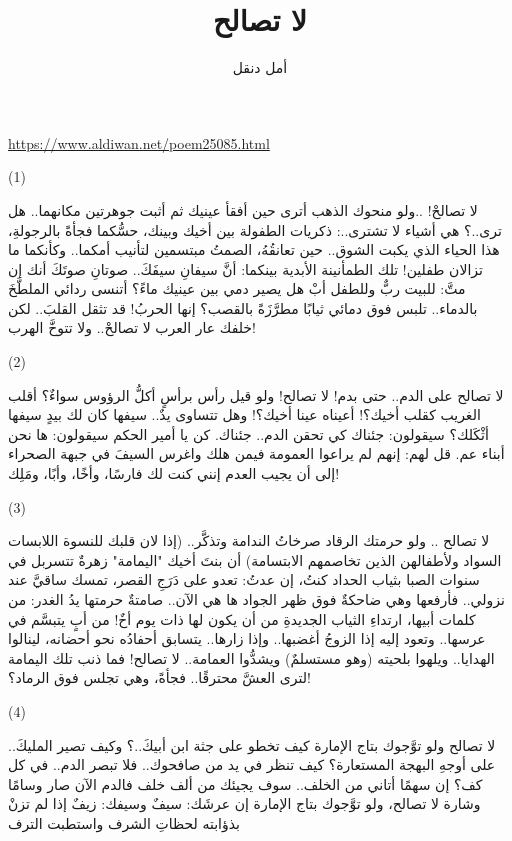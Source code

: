 \documentclass{article}
\title{لا تصالح}
\author{\textarabic{أمل دنقل}}
\date{}
\begin{document}
\centering

\maketitle

\textenglish{\href{https://www.aldiwan.net/poem25085.html}{https://www.aldiwan.net/poem25085.html}}

\begin{modernpoem*}
(\textenglish{1})

لا تصالحْ!
..ولو منحوك الذهب
أترى حين أفقأ عينيك
ثم أثبت جوهرتين مكانهما..
هل ترى..؟
هي أشياء لا تشترى..:
ذكريات الطفولة بين أخيك وبينك،
حسُّكما فجأةً بالرجولةِ،
هذا الحياء الذي يكبت الشوق.. حين تعانقُهُ،
الصمتُ مبتسمين لتأنيب أمكما.. وكأنكما
ما تزالان طفلين!
تلك الطمأنينة الأبدية بينكما:
أنَّ سيفانِ سيفَكَ..
صوتانِ صوتَكَ
أنك إن متَّ:
للبيت ربٌّ
وللطفل أبْ
هل يصير دمي بين عينيك ماءً؟
أتنسى ردائي الملطَّخَ بالدماء..
تلبس فوق دمائي ثيابًا مطرَّزَةً بالقصب؟
إنها الحربُ!
قد تثقل القلبَ..
لكن خلفك عار العرب
لا تصالحْ..
ولا تتوخَّ الهرب!

(\textenglish{2})

لا تصالح على الدم.. حتى بدم!
لا تصالح! ولو قيل رأس برأسٍ
أكلُّ الرؤوس سواءٌ؟
أقلب الغريب كقلب أخيك؟!
أعيناه عينا أخيك؟!
وهل تتساوى يدٌ.. سيفها كان لك
بيدٍ سيفها أثْكَلك؟
سيقولون:
جئناك كي تحقن الدم..
جئناك. كن يا أمير الحكم
سيقولون:
ها نحن أبناء عم.
قل لهم: إنهم لم يراعوا العمومة فيمن هلك
واغرس السيفَ في جبهة الصحراء
إلى أن يجيب العدم
إنني كنت لك
فارسًا،
وأخًا،
وأبًا،
ومَلِك!

(\textenglish{3})

لا تصالح ..
ولو حرمتك الرقاد
صرخاتُ الندامة
وتذكَّر..
(إذا لان قلبك للنسوة اللابسات السواد ولأطفالهن الذين تخاصمهم الابتسامة)
أن بنتَ أخيك "اليمامة"
زهرةٌ تتسربل في سنوات الصبا
بثياب الحداد
كنتُ، إن عدتُ:
تعدو على دَرَجِ القصر،
تمسك ساقيَّ عند نزولي..
فأرفعها وهي ضاحكةٌ
فوق ظهر الجواد
ها هي الآن.. صامتةٌ
حرمتها يدُ الغدر:
من كلمات أبيها،
ارتداءِ الثياب الجديدةِ
من أن يكون لها ذات يوم أخٌ!
من أبٍ يتبسَّم في عرسها..
وتعود إليه إذا الزوجُ أغضبها..
وإذا زارها.. يتسابق أحفادُه نحو أحضانه،
لينالوا الهدايا..
ويلهوا بلحيته (وهو مستسلمٌ)
ويشدُّوا العمامة..
لا تصالح!
فما ذنب تلك اليمامة
لترى العشَّ محترقًا.. فجأةً،
وهي تجلس فوق الرماد؟!

(\textenglish{4})

لا تصالح
ولو توَّجوك بتاج الإمارة
كيف تخطو على جثة ابن أبيكَ..؟
وكيف تصير المليكَ..
على أوجهِ البهجة المستعارة؟
كيف تنظر في يد من صافحوك..
فلا تبصر الدم..
في كل كف؟
إن سهمًا أتاني من الخلف..
سوف يجيئك من ألف خلف
فالدم الآن صار وسامًا وشارة
لا تصالح،
ولو توَّجوك بتاج الإمارة
إن عرشَك: سيفٌ
وسيفك: زيفٌ
إذا لم تزنْ بذؤابته لحظاتِ الشرف
واستطبت الترف


\end{modernpoem*}
\end{document}
